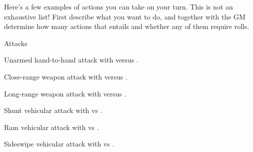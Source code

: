 
Here's a few examples of actions you can take on your turn. This is not an exhaustive list! First describe what you want to do, and together with the GM determine how many actions that entails and whether any of them require rolls.

\begin{abstractsection}{Attacks}
\vspace{1ex}

\begin{describe}{Unarmed hand-to-hand}
  attack with  versus .
\end{describe}

\begin{describe}{Close-range weapon}
  attack with  versus .
\end{describe}

\begin{describe}{Long-range weapon}
  attack with  versus .
\end{describe}

\begin{describe}{Shunt}
  vehicular attack with  vs .
\end{describe}

\begin{describe}{Ram}
  vehicular attack with  vs .
\end{describe}

\begin{describe}{Sideswipe}
  vehicular attack with  vs .
\end{describe}
\end{abstractsection}

